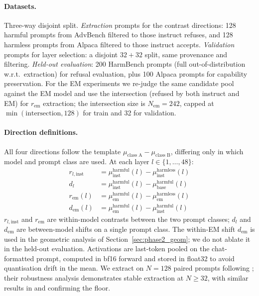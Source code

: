 \documentclass{article}
\newcommand{\rinst}{r_{l,\mathrm{inst}}}
\newcommand{\dinst}{d_{l}}
\newcommand{\rem}{r_{\mathrm{em}}}
\newcommand{\dem}{d_{\mathrm{em}}}
\begin{document}
\paragraph{Datasets.} Three-way disjoint split. \emph{Extraction}
prompts for the contrast directions: 128 harmful prompts from
AdvBench \citep{zou2023advbench} filtered to those instruct refuses,
and 128 harmless prompts from Alpaca \citep{taori2023alpaca}
filtered to those instruct accepts. \emph{Validation} prompts for
layer selection: a disjoint $32+32$ split, same provenance and
filtering. \emph{Held-out evaluation}: 200 HarmBench
\citep{mazeika2024harmbench} prompts (full out-of-distribution
w.r.t.\ extraction) for refusal evaluation, plus 100 Alpaca prompts
for capability preservation. For the EM experiments we re-judge the
same candidate pool against the EM model and use the intersection
(refused by both instruct and EM) for $\rem$ extraction; the
intersection size is $N_{\mathrm{em}}=242$, capped at
$\min(\mathrm{intersection}, 128)$ for train and 32 for validation.

\paragraph{Direction definitions.} All four directions follow the
template $\mu_{\text{class A}} - \mu_{\text{class B}}$, differing
only in which model and prompt class are used. At each layer
$l \in \{1, \ldots, 48\}$:
\begin{align*}
  \rinst        &= \mu^{\mathrm{harmful}}_{\mathrm{inst}}(l)
                 - \mu^{\mathrm{harmless}}_{\mathrm{inst}}(l) \\
  \dinst        &= \mu^{\mathrm{harmful}}_{\mathrm{inst}}(l)
                 - \mu^{\mathrm{harmful}}_{\mathrm{base}}(l) \\
  \rem(l)       &= \mu^{\mathrm{harmful}}_{\mathrm{em}}(l)
                 - \mu^{\mathrm{harmless}}_{\mathrm{em}}(l) \\
  \dem(l)       &= \mu^{\mathrm{harmful}}_{\mathrm{em}}(l)
                 - \mu^{\mathrm{harmful}}_{\mathrm{inst}}(l)
\end{align*}
$\rinst$ and $\rem$ are within-model contrasts between the two
prompt classes; $\dinst$ and $\dem$ are between-model shifts on a
single prompt class. The within-EM shift $\dem$ is used in the
geometric analysis of Section~\ref{sec:phase2_geom}; we do not
ablate it in the held-out evaluation. Activations are last-token
pooled on the chat-formatted prompt, computed in bf16 forward and
stored in float32 to avoid quantisation drift in the mean. We
extract on $N=128$ paired prompts following \citet{arditi2024refusal};
their robustness analysis demonstrates stable extraction at
$N \geq 32$, with similar results in
\citet{panickssery2024steering} and \citet{marks2024geometry}
confirming the floor.
\end{document}
